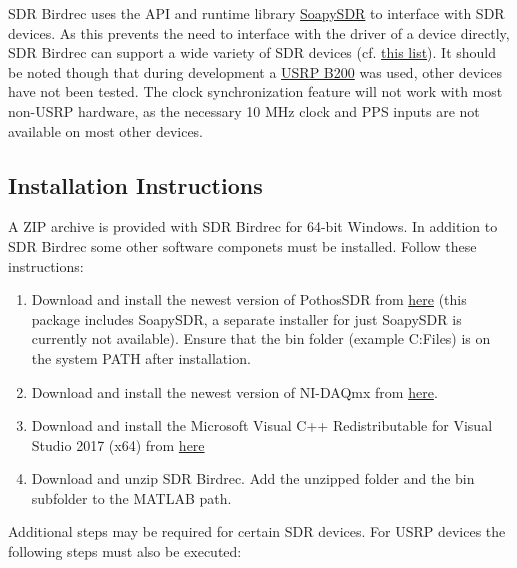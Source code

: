 \documentclass[10pt]{article}
\begin{document}
SDR Birdrec uses the API and runtime library
\href{https://github.com/pothosware/SoapySDR/wiki}{SoapySDR} to
interface with SDR devices. As this prevents the need to interface with
the driver of a device directly, SDR Birdrec can support a wide variety
of SDR devices (cf.
\href{https://github.com/pothosware/SoapySDR/wiki/FAQ\#what-devices-are-supported}{this
list}). It should be noted though that during development a
\href{https://www.ettus.com/product/details/UB200-KIT}{USRP B200} was
used, other devices have not been tested. The clock synchronization
feature will not work with most non-USRP hardware, as the necessary 10
MHz clock and PPS inputs are not available on most other devices.

\subsection{Installation Instructions}\label{installation-instructions}

A ZIP archive is provided with SDR Birdrec for 64-bit Windows. In
addition to SDR Birdrec some other software componets must be installed.
Follow these instructions:

\begin{enumerate}
\def\labelenumi{\arabic{enumi}.}
\tightlist
\item
  Download and install the newest version of PothosSDR from
  \href{https://github.com/pothosware/PothosSDR/wiki/Tutorial\#id1}{here}
  (this package includes SoapySDR, a separate installer for just
  SoapySDR is currently not available). Ensure that the bin folder
  (example C:\Program Files\PothosSDR\bin) is on the system PATH after
  installation.
\item
  Download and install the newest version of NI-DAQmx from
  \href{https://www.ni.com/dataacquisition/nidaqmx.htm}{here}.
\item
  Download and install the Microsoft Visual C++ Redistributable for
  Visual Studio 2017 (x64) from
  \href{https://go.microsoft.com/fwlink/?LinkId=746572}{here}
\item
  Download and unzip SDR Birdrec. Add the unzipped folder and the bin
  subfolder to the MATLAB path.
\end{enumerate}

Additional steps may be required for certain SDR devices. For USRP
devices the following steps must also be executed:
\end{document}
